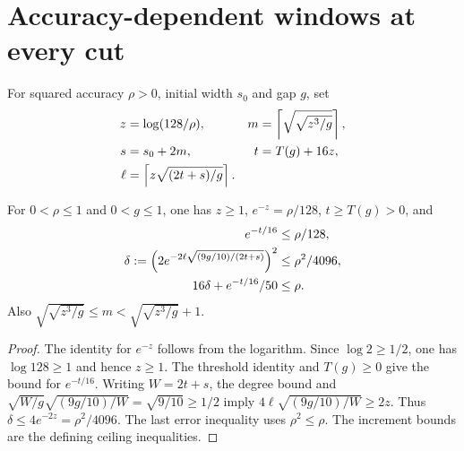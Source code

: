 \section{Accuracy-dependent windows at every cut}

\begin{definition}
    \label{def:aklv_accuracy_parameters}
    \leanok
    For squared accuracy $\rho>0$, initial width $s_0$ and gap $g$, set
    \begin{align*}
        z    & =\log(128/\rho),                           & m & =\left\lceil\sqrt{\sqrt{z^3/g}}\right\rceil,\notag \\
        s    & =s_0+2m,                                   & t & =T(g)+16z,\notag                                   \\
        \ell & =\left\lceil z\sqrt{(2t+s)/g}\right\rceil.
    \end{align*}
\end{definition}

\begin{lemma}
    \label{thm:aklv_accuracy_parameter_bounds}
    \leanok
    For $0<\rho\le1$ and $0<g\le1$, one has $z\ge1$,
    $e^{-z}=\rho/128$, $t\ge T(g)>0$, and
    \begin{align*}
        e^{-t/16}             & \le\rho/128,\notag    \\
        \delta:=\left(2e^{-2\ell\sqrt{(9g/10)/(2t+s)}}\right)^2
                              & \le\rho^2/4096,\notag \\
        16\delta+e^{-t/16}/50 & \le\rho.
    \end{align*}
    Also $\sqrt{\sqrt{z^3/g}}\le m<\sqrt{\sqrt{z^3/g}}+1$.
\end{lemma}
\begin{proof}
    \leanok
    The identity for $e^{-z}$ follows from the logarithm.
    Since $\log2\ge1/2$, one has $\log128\ge1$ and hence $z\ge1$.
    The threshold identity and $T(g)\ge0$ give the bound for $e^{-t/16}$.
    Writing $W=2t+s$, the degree bound and
    $\sqrt{W/g}\sqrt{(9g/10)/W}=\sqrt{9/10}\ge1/2$
    imply $4\ell\sqrt{(9g/10)/W}\ge2z$.
    Thus $\delta\le4e^{-2z}=\rho^2/4096$.
    The last error inequality uses $\rho^2\le\rho$.
    The increment bounds are the defining ceiling inequalities.
\end{proof}

